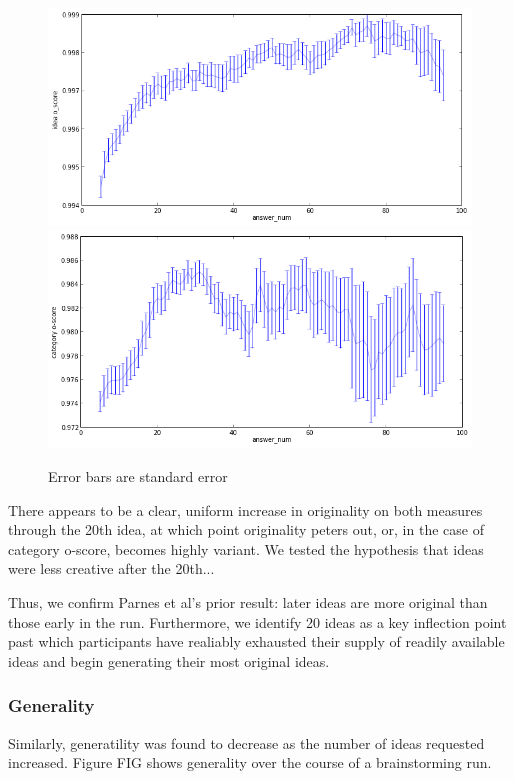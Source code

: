 \begin{figure}[h]
    \centering
    \includegraphics[width=0.9\columnwidth]{run_idea_oscore}
    \includegraphics[width=0.9\columnwidth]{run_category_oscore}
    \caption{Error bars are standard error}
\end{figure}

There appears to be a clear, uniform increase in originality on both measures through the 20th idea, at which point originality peters out, or, in the case of category o-score, becomes highly variant. We tested the hypothesis that ideas were less creative after the 20th...

Thus, we confirm Parnes et al's prior result: later ideas are more original than those early in the run. Furthermore, we identify 20 ideas as a key inflection point past which participants have realiably exhausted their supply of readily available ideas and begin generating their most original ideas.

\subsubsection{Generality}

Similarly, generatility was found to decrease as the number of ideas requested increased. Figure FIG shows generality over the course of a brainstorming run.

